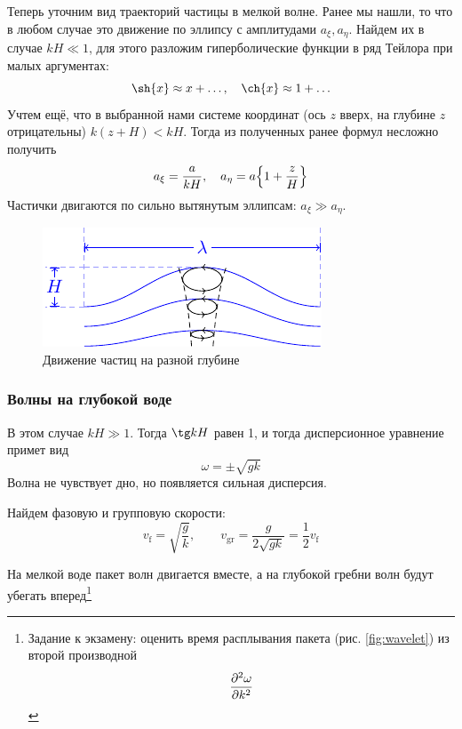 Теперь уточним вид траекторий частицы в мелкой волне. Ранее мы нашли, то что в любом случае это движение по эллипсу с амплитудами $a_\xi, a_\eta$. Найдем их в случае $kH\ll 1$, для этого разложим гиперболические функции  в ряд Тейлора при малых аргументах:
\begin{equation}
    \sh{x}\approx x+\ldots, \quad \ch{x}\approx 1+\ldots
\end{equation}
Учтем ещё, что в выбранной нами системе координат (ось $z$ вверх, на глубине $z$ отрицательны) $k(z+H)<kH$. Тогда из полученных ранее формул несложно получить
\begin{equation}
    a_\xi = \frac{a}{kH}, \quad
    a_\eta = a\qty{1+\frac{z}{H}}
\end{equation}
Частички двигаются по сильно вытянутым эллипсам: $a_\xi \gg a_\eta$.

\begin{figure}[H]
    \centering
    \includegraphics[scale=1.5]{img/ellipse2}
    \caption{Движение частиц на разной глубине}
    \label{fig:ellipse2}
\end{figure}



\subsubsection{Волны на глубокой воде}

В этом случае $kH \gg 1$. Тогда $\tg kH$ равен 1, и тогда дисперсионное уравнение примет вид
\begin{equation}
	\omega=\pm\sqrt{gk}
\end{equation}
Волна не чувствует дно, но появляется сильная дисперсия. 

Найдем фазовую и групповую скорости:
\begin{equation}
	v_\text{f}=\sqrt{\frac{g}{k}}, \qquad v_\text{gr}=\frac{g}{2\sqrt{gk}}=\frac12 v_\text{f}
\end{equation}


На мелкой воде пакет волн двигается вместе, а на глубокой гребни волн будут убегать вперед\footnote{
 Задание к экзамену: оценить время расплывания пакета (рис. \ref{fig:wavelet}) из второй производной
$$
	\pdv[2]{\omega}{k} 	
$$ }



